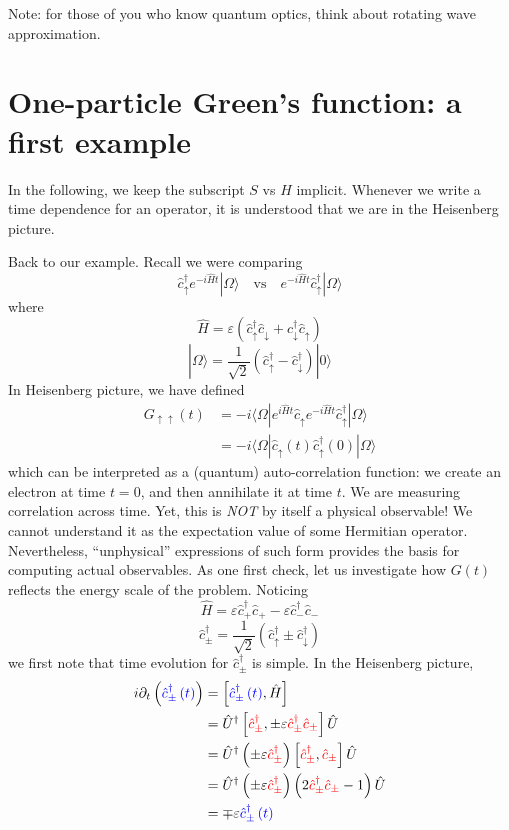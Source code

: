 Note: for those of you who know quantum optics, think about rotating wave approximation.

\section{One-particle Green's function: a first example}

In the following, we keep the subscript $S$ vs $H$ implicit. Whenever we write a time dependence for an operator, it is understood that we are in the Heisenberg picture.

Back to our example. Recall we were comparing
\[ \hat{c}_{\uparrow}^{\dagger}e^{-i\hat{H}t}|\Omega \rangle \quad \mathrm{vs}\quad e^{-i\hat{H}t}\hat{c}_{\uparrow}^{\dagger}|\Omega \rangle \]
where
\[ \hat{H}=\varepsilon \left( \hat{c}_{\uparrow}^{\dagger}\hat{c}_{\downarrow}+\hat{c}_{\downarrow}^{\dagger}\hat{c}_{\uparrow} \right) \]
\[ |\Omega \rangle =\frac{1}{\sqrt{2}}\left( \hat{c}_{\uparrow}^{\dagger}-\hat{c}_{\downarrow}^{\dagger} \right) |0\rangle \]
In Heisenberg picture, we have defined
\begin{align*}
    G_{\uparrow \uparrow}\left( t \right) &=-i\langle \Omega |e^{i\hat{H}t}\hat{c}_{\uparrow}e^{-i\hat{H}t}\hat{c}_{\uparrow}^{\dagger}|\Omega \rangle \\
    &=-i\langle \Omega |\hat{c}_{\uparrow}\left( t \right) \hat{c}_{\uparrow}^{\dagger}\left( 0 \right) |\Omega \rangle
\end{align*}
which can be interpreted as a (quantum) auto-correlation function: we create an electron at time $t=0$, and then annihilate it at time $t$. We are measuring correlation across time. Yet, this is \emph{NOT} by itself a physical observable! We cannot understand it as the expectation value of some Hermitian operator. Nevertheless, ``unphysical'' expressions of such form provides the basis for computing actual observables. As one first check, let us investigate how $G(t)$ reflects the energy scale of the problem. Noticing
\[ \hat{H}=\varepsilon \hat{c}_{+}^{\dagger}\hat{c}_+-\varepsilon \hat{c}_{-}^{\dagger}\hat{c}_-\]
\[ \hat{c}_{\pm}^{\dagger}=\frac{1}{\sqrt{2}}\left( \hat{c}_{\uparrow}^{\dagger}\pm \hat{c}_{\downarrow}^{\dagger} \right) \]
we first note that time evolution for $\hat{c}_{\pm}^\dagger$ is simple. In the Heisenberg picture,
\begin{align*}
    i\partial _t\left( {\color{blue} \hat{c}_{\pm}^{\dagger}\left( t \right) } \right) &=\left[ {\color{blue} \hat{c}_{\pm}^{\dagger}\left( t \right) },\hat{H} \right] \\
    &=\hat{U}^{\dagger}\left[ {\color{red} \hat{c}_{\pm}^{\dagger}},\pm \varepsilon {\color{red} \hat{c}_{\pm}^{\dagger}\hat{c}_{\pm}} \right] \hat{U}\\
    &=\hat{U}^{\dagger}\left( \pm \varepsilon {\color{red} \hat{c}_{\pm}^{\dagger}} \right) \left[ {\color{red} \hat{c}_{\pm}^{\dagger}},{\color{red} \hat{c}_{\pm}} \right] \hat{U}\\
    &=\hat{U}^{\dagger}\left( \pm \varepsilon {\color{red} \hat{c}_{\pm}^{\dagger}} \right) \left( 2{\color{red} \hat{c}_{\pm}^{\dagger}\hat{c}_{\pm}}-1 \right) \hat{U}\\
    &=\mp \varepsilon {\color{blue} \hat{c}_{\pm}^{\dagger}\left( t \right) }
\end{align*}
